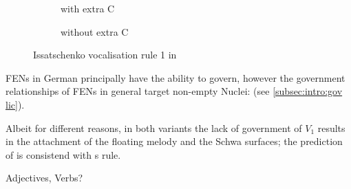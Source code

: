 \begin{figure}[h]
  \centering
  \begin{subfigure}{.49\textwidth}
    \centering
    \begin{structure}
      \V[floating]{\textschwa}
      \emptyV
      \fen
    \end{structure}
    \caption{with extra C}
    \label{fig:issatschenko voc rule 1:L C end}
  \end{subfigure}
  \hfill
  \begin{subfigure}{.49\textwidth}
    \centering
    \begin{structure}
      \V[floating]{\textschwa}
      \fen
    \end{structure}
    \caption{without extra C}
    \label{fig:issatschenko voc rule 1:L end}
  \end{subfigure}
  \caption{Issatschenko vocalisation rule 1 in \CVCV}
  \label{fig:issatschenko voc rule 1}
\end{figure}

\Glspl{FEN} in German principally have the ability
to govern, however the government relationships of
\glspl{FEN} in general  target
non-empty Nuclei:
 (see \cref{subsec:intro:gov lic}).

Albeit for different reasons, in both variants
the lack of government of $V_1$ results in the
attachment of the floating melody and the Schwa
surfaces; the prediction of \CVCV is consistend with
\citeauthor{issatschenko1974}s rule.



  Adjectives, Verbs?